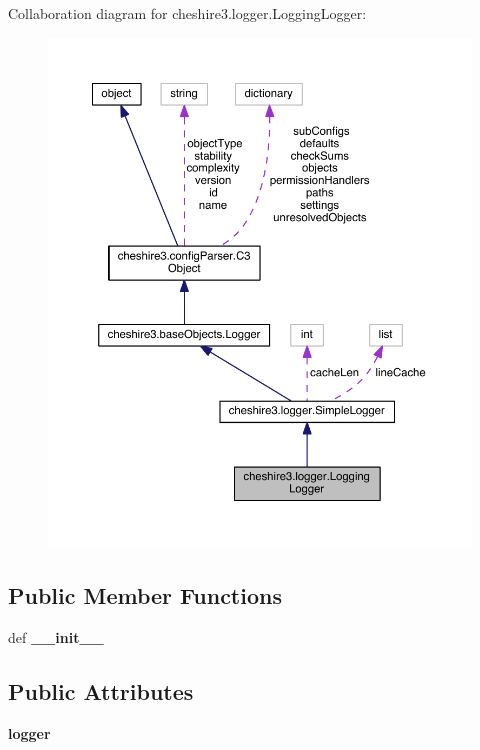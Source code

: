 Collaboration diagram for cheshire3.\-logger.\-Logging\-Logger\-:
\nopagebreak
\begin{figure}[H]
\begin{center}
\leavevmode
\includegraphics[width=350pt]{classcheshire3_1_1logger_1_1_logging_logger__coll__graph}
\end{center}
\end{figure}
\subsection*{Public Member Functions}
\begin{DoxyCompactItemize}
\item 
\hypertarget{classcheshire3_1_1logger_1_1_logging_logger_a91013d52cc2140ccd28c8aabd56df5eb}{def {\bfseries \-\_\-\-\_\-init\-\_\-\-\_\-}}\label{classcheshire3_1_1logger_1_1_logging_logger_a91013d52cc2140ccd28c8aabd56df5eb}

\end{DoxyCompactItemize}
\subsection*{Public Attributes}
\begin{DoxyCompactItemize}
\item 
\hypertarget{classcheshire3_1_1logger_1_1_logging_logger_add984d297c5703aaae807da5e2a0740c}{{\bfseries logger}}\label{classcheshire3_1_1logger_1_1_logging_logger_add984d297c5703aaae807da5e2a0740c}

\end{DoxyCompactItemize}
